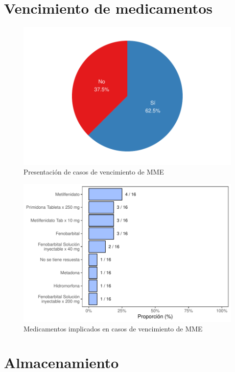 \documentclass[
]{book}
\begin{document}
\hypertarget{vencimiento-de-medicamentos}{%
\section{Vencimiento de medicamentos}\label{vencimiento-de-medicamentos}}

\begin{figure}
\includegraphics[width=0.85\linewidth]{InformeFinal_files/figure-latex/CasosVencimiento1-1} \caption{Presentación de casos de vencimiento de MME}\label{fig:CasosVencimiento1}
\end{figure}

\begin{figure}
\includegraphics[width=0.85\linewidth]{InformeFinal_files/figure-latex/CasosVencimiento2-1} \caption{Medicamentos implicados en casos de vencimiento de MME}\label{fig:CasosVencimiento2}
\end{figure}

\hypertarget{almacenamiento}{%
\section{Almacenamiento}\label{almacenamiento}}
\end{document}
